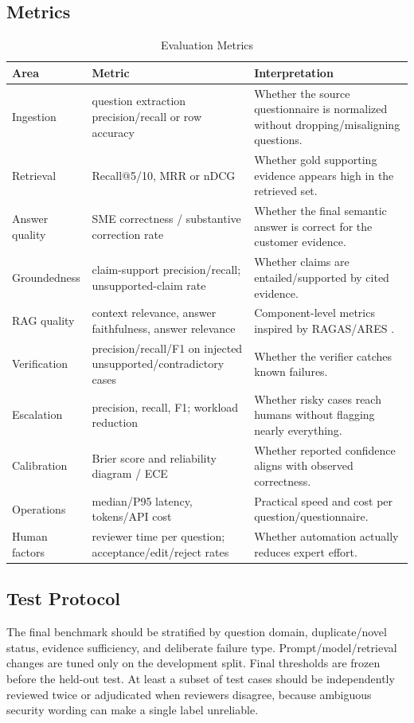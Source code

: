 \documentclass[11pt,journal,onecolumn]{IEEEtran}
\begin{document}
\subsection{Metrics}
\begin{table}[H]
\centering
\caption{Evaluation Metrics}
\small
\begin{tabularx}{\textwidth}{L{0.22\textwidth}L{0.24\textwidth}Y}
\toprule
\textbf{Area} & \textbf{Metric} & \textbf{Interpretation} \\
\midrule
Ingestion & question extraction precision/recall or row accuracy & Whether the source questionnaire is normalized without dropping/misaligning questions. \\
Retrieval & Recall@5/10, MRR or nDCG & Whether gold supporting evidence appears high in the retrieved set. \\
Answer quality & SME correctness / substantive correction rate & Whether the final semantic answer is correct for the customer evidence. \\
Groundedness & claim-support precision/recall; unsupported-claim rate & Whether claims are entailed/supported by cited evidence. \\
RAG quality & context relevance, answer faithfulness, answer relevance & Component-level metrics inspired by RAGAS/ARES \cite{es2024ragas,saadfalcon2024ares}. \\
Verification & precision/recall/F1 on injected unsupported/contradictory cases & Whether the verifier catches known failures. \\
Escalation & precision, recall, F1; workload reduction & Whether risky cases reach humans without flagging nearly everything. \\
Calibration & Brier score and reliability diagram / ECE & Whether reported confidence aligns with observed correctness. \\
Operations & median/P95 latency, tokens/API cost & Practical speed and cost per question/questionnaire. \\
Human factors & reviewer time per question; acceptance/edit/reject rates & Whether automation actually reduces expert effort. \\
\bottomrule
\end{tabularx}
\end{table}

\subsection{Test Protocol}
The final benchmark should be stratified by question domain, duplicate/novel status, evidence sufficiency, and deliberate failure type. Prompt/model/retrieval changes are tuned only on the development split. Final thresholds are frozen before the held-out test. At least a subset of test cases should be independently reviewed twice or adjudicated when reviewers disagree, because ambiguous security wording can make a single label unreliable.
\end{document}

